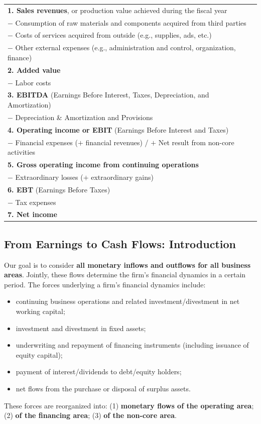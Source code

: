 \begin{center}
\begin{tabular}{@{}l@{}}
\toprule
\textbf{\color{bocconi}1. Sales revenues}, or production value achieved during the fiscal year\\
\quad $-$ Consumption of raw materials and components acquired from third parties\\
\quad $-$ Costs of services acquired from outside (e.g., supplies, ads, etc.)\\
\quad $-$ Other external expenses (e.g., administration and control, organization, finance)\\
\midrule
\textbf{\color{bocconi}2. Added value}\\
\quad $-$ Labor costs\\
\midrule
\textbf{\color{bocconi}3. EBITDA} (Earnings Before Interest, Taxes, Depreciation, and Amortization)\\
\quad $-$ Depreciation \& Amortization and Provisions\\
\midrule
\textbf{\color{bocconi}4. Operating income or EBIT} (Earnings Before Interest and Taxes)\\
\quad $-$ Financial expenses ($+$ financial revenues) / $+$ Net result from non-core activities\\
\midrule
\textbf{\color{bocconi}5. Gross operating income from continuing operations}\\
\quad $-$ Extraordinary losses ($+$ extraordinary gains)\\
\midrule
\textbf{\color{bocconi}6. EBT} (Earnings Before Taxes)\\
\quad $-$ Tax expenses\\
\midrule
\textbf{\color{bocconi}7. Net income}\\
\bottomrule
\end{tabular}
\end{center}

\subsection[From Earnings to Cash Flows: Introduction]{From Earnings to Cash Flows: Introduction }

Our goal is to consider \textbf{all monetary inflows and outflows for all business areas}. Jointly, these flows determine the firm's financial dynamics in a certain period. The forces underlying a firm's financial dynamics include:
\begin{itemize}
  \item continuing business operations and related investment/divestment in net working capital;
  \item investment and divestment in fixed assets;
  \item underwriting and repayment of financing instruments (including issuance of equity capital);
  \item payment of interest/dividends to debt/equity holders;
  \item net flows from the purchase or disposal of surplus assets.
\end{itemize}
These forces are reorganized into: (1) \textbf{monetary flows of the operating area}; (2) \textbf{of the financing area}; (3) \textbf{of the non-core area}.

